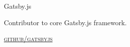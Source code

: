 {
    {\raggedright\large {
        Gatsby.js
    } \\}

    Contributor to core Gatsby.js framework.

    \textsc{\small\href{http://github.com/gatsbyjs}{github/gatsbyjs}}
} \\
